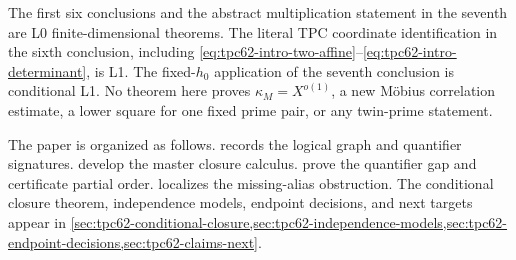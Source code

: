 The first six conclusions and the abstract multiplication statement in the
seventh are L0 finite-dimensional theorems.  The literal TPC coordinate
identification in the sixth conclusion, including
\eqref{eq:tpc62-intro-two-affine}--\eqref{eq:tpc62-intro-determinant}, is
L1.  The fixed-\(h_0\) application of the seventh conclusion is conditional
L1.  No theorem here proves
\(\kappa_M=X^{o(1)}\), a new M\"obius correlation estimate, a lower square
for one fixed prime pair, or any twin-prime statement.

The paper is organized as follows.
 records the logical graph and quantifier
signatures.   develop
the master closure calculus.
 prove the
quantifier gap and certificate partial order.
 localizes the missing-alias obstruction.
The conditional closure theorem, independence models, endpoint decisions,
and next targets appear in
\cref{sec:tpc62-conditional-closure,sec:tpc62-independence-models,sec:tpc62-endpoint-decisions,sec:tpc62-claims-next}.

